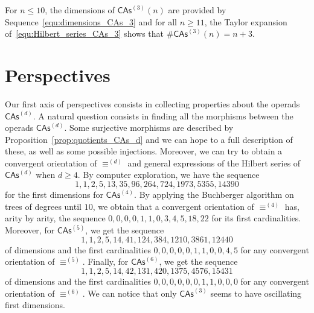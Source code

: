 \documentclass[10pt,reqno]{amsart}
\numberwithin{equation}{subsection}
\renewcommand{\leq}{\leqslant}
\renewcommand{\geq}{\geqslant}
\newcommand{\CAs}[1]{\mathsf{CAs}^{(#1)}}
\DeclareMathOperator{\Congr}{\equiv}
\newcommand{\CongrCAs}[1]{\Congr^{(#1)}}
\begin{document}
For $n \leq 10$, the dimensions of $\CAs{3}(n)$ are provided by
Sequence~\eqref{equ:dimensions_CAs_3} and for all $n \geq 11$, the
Taylor expansion of~\eqref{equ:Hilbert_series_CAs_3} shows that
$\# \CAs{3}(n) = n + 3$.

\section*{Perspectives}
Our first axis of perspectives consists in collecting properties about
the operads $\CAs{d}$. A natural question consists in finding all the
morphisms between the operads $\CAs{d}$. Some surjective morphisms are
described by Proposition~\ref{prop:quotients_CAs_d} and we can hope to a
full description of these, as well as some possible injections.
Moreover, we can try to obtain a convergent orientation of
$\CongrCAs{d}$ and general expressions of the Hilbert series of
$\CAs{d}$ when $d \geq 4$. By computer exploration, we have the sequence
\begin{equation}
    1, 1, 2, 5, 13, 35, 96, 264, 724, 1973, 5355, 14390
\end{equation}
for the first dimensions for $\CAs{4}$. By applying the Buchberger
algorithm on trees of degrees until $10$, we obtain that a convergent
orientation of $\CongrCAs{4}$ has, arity by arity, the sequence
\begin{math}
    0, 0, 0, 0, 1, 1, 0, 3, 4, 5, 18, 22
\end{math}
for its first cardinalities. Moreover, for $\CAs{5}$, we get the
sequence
\begin{equation}
    1, 1, 2, 5, 14, 41, 124, 384, 1210, 3861, 12440
\end{equation}
of dimensions and the first cardinalities
\begin{math}
    0, 0, 0, 0, 0, 1, 1, 0, 0, 4, 5
\end{math}
for any convergent orientation of $\CongrCAs{5}$. Finally, for
$\CAs{6}$, we get the sequence
\begin{equation}
    1, 1, 2, 5, 14, 42, 131, 420, 1375, 4576, 15431
\end{equation}
of dimensions and the first cardinalities
\begin{math}
    0, 0, 0, 0, 0, 0, 1, 1, 0, 0, 0
\end{math}
for any convergent orientation of $\CongrCAs{6}$. We can notice that
only $\CAs{3}$ seems to have oscillating first dimensions.
\end{document}
